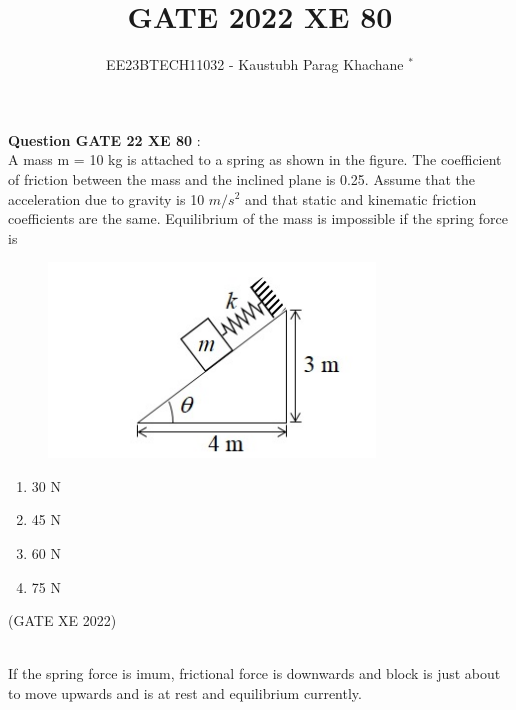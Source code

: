 \documentclass[journal,12pt,twocolumn]{IEEEtran}
\theoremstyle{remark}
\begin{document}

\vspace{3cm}

\Large\title{GATE 2022 XE 80}
\large\author{EE23BTECH11032 - Kaustubh Parag Khachane $^{*}$%
}
\maketitle
\newpage
\bigskip

\renewcommand{\thefigure}{\theenumi}
\renewcommand{\thetable}{\theenumi}
\large\textbf{Question GATE 22 XE 80} :\\
A mass m = 10 kg is attached to a spring as shown in the figure. The coefficient
of friction between the mass and the inclined plane is 0.25. Assume that the
acceleration due to gravity is 10 $m/s^2$ and that static and kinematic friction
coefficients are the same. Equilibrium of the mass is impossible if the spring
force is
\begin{figure}[!ht]
\centering
\begin{center}
\includegraphics[width=\columnwidth]{question}
\end{center}
\end{figure}
\begin{enumerate}
    \item 30 N
    \item 45 N
    \item 60 N
    \item 75 N
\end{enumerate}
\hfill(GATE XE 2022)\\
\solution\\
\fi

If the spring force is imum, frictional force is downwards and block is just about to move upwards and is at rest and equilibrium currently.\\
\end{document}
